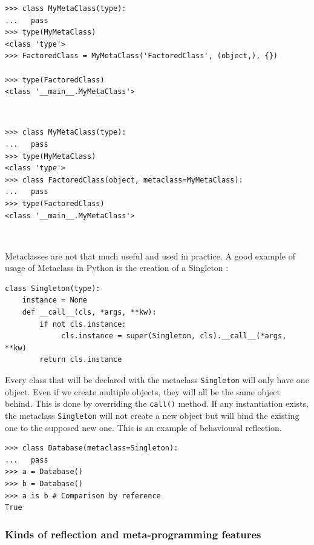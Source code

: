 \documentclass[a4paper,10pt]{article}
\begin{document}
\begin{minipage}[c]{.5\linewidth}
\begin{lstlisting}[caption=Without syntactic sugar]
>>> class MyMetaClass(type):
...   pass
>>> type(MyMetaClass)
<class 'type'>
>>> FactoredClass = MyMetaClass('FactoredClass', (object,), {})

>>> type(FactoredClass)
<class '__main__.MyMetaClass'>
\end{lstlisting}
~\\
\end{minipage} \hfill
\begin{minipage}[c]{.5\linewidth}
\begin{lstlisting}[caption=With syntactic sugar]
>>> class MyMetaClass(type):
...   pass
>>> type(MyMetaClass)
<class 'type'>
>>> class FactoredClass(object, metaclass=MyMetaClass):
...   pass
>>> type(FactoredClass)
<class '__main__.MyMetaClass'>
\end{lstlisting}
~\\
\end{minipage}

Metaclasses are not that much useful and used in practice.
A good example of usage of Metaclass in Python is the creation of a Singleton \cite{ python:singleton} :

\begin{lstlisting}
class Singleton(type):
    instance = None
    def __call__(cls, *args, **kw):
        if not cls.instance:
             cls.instance = super(Singleton, cls).__call__(*args, **kw)
        return cls.instance
\end{lstlisting}

Every class that will be declared with the metaclass \lstinline|Singleton| will only have one object.
Even if we create multiple objects, they will all be the same object behind.
This is done by overriding the \lstinline|call()| method.
If any instantiation exists, the metaclass \lstinline|Singleton| will not create a new object but will bind the existing one to the supposed new one. This is an example of behavioural reflection.
\newpage
\begin{lstlisting}
>>> class Database(metaclass=Singleton):
...   pass
>>> a = Database()
>>> b = Database()
>>> a is b # Comparison by reference
True
\end{lstlisting}


\subsubsection{Kinds of reflection and meta-programming features}
\end{document}
